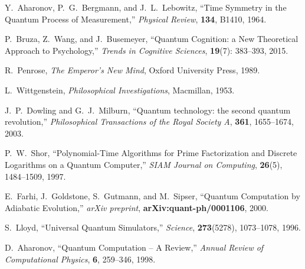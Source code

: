\documentclass[11pt]{article}
\begin{document}
\begin{thebibliography}{99}

Y.~Aharonov, P.~G.~Bergmann, and J.~L.~Lebowitz, 
``Time Symmetry in the Quantum Process of Measurement,''
\emph{Physical Review}, \textbf{134}, B1410, 1964.

P.~Bruza, Z.~Wang, and J.~Busemeyer, 
``Quantum Cognition: a New Theoretical Approach to Psychology,''
\emph{Trends in Cognitive Sciences}, \textbf{19}(7): 383--393, 2015.

R.~Penrose, 
\emph{The Emperor's New Mind}, 
Oxford University Press, 1989.

L.~Wittgenstein,
\emph{Philosophical Investigations},
Macmillan, 1953.

J.~P.~Dowling and G.~J.~Milburn, 
``Quantum technology: the second quantum revolution,''
\emph{Philosophical Transactions of the Royal Society A}, \textbf{361}, 1655--1674, 2003.

P.~W.~Shor,
``Polynomial-Time Algorithms for Prime Factorization and Discrete Logarithms on a Quantum Computer,''
\emph{SIAM Journal on Computing}, \textbf{26}(5), 1484--1509, 1997.

E.~Farhi, J.~Goldstone, S.~Gutmann, and M.~Sipser,
``Quantum Computation by Adiabatic Evolution,''
\emph{arXiv preprint}, \textbf{arXiv:quant-ph/0001106}, 2000.

S.~Lloyd,
``Universal Quantum Simulators,''
\emph{Science}, \textbf{273}(5278), 1073--1078, 1996.

D.~Aharonov, 
``Quantum Computation -- A Review,''
\emph{Annual Review of Computational Physics}, \textbf{6}, 259--346, 1998.

\end{thebibliography}
\end{document}
